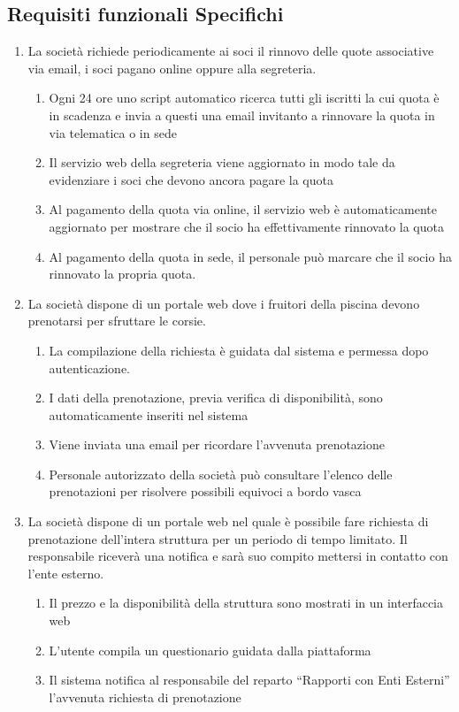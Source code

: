 \documentclass[11pt]{article} %
\begin{document}
\subsection{Requisiti funzionali Specifichi}

\begin{enumerate}
	\item La società richiede periodicamente ai soci il rinnovo delle quote associative via email, i soci pagano online oppure alla segreteria.
	\begin{enumerate}
		\item Ogni 24 ore uno script automatico ricerca tutti gli iscritti la cui quota è in scadenza e invia a questi una email invitanto a rinnovare la quota in via telematica o in sede
		\item Il servizio web della segreteria viene aggiornato in modo tale da evidenziare i soci che devono ancora pagare la quota
		\item Al pagamento della quota via online, il servizio web è automaticamente aggiornato per mostrare che il socio ha effettivamente rinnovato la quota
		\item Al pagamento della quota in sede, il personale può marcare che il socio ha rinnovato la propria quota.
	\end{enumerate}

	\item La società dispone di un portale web dove i fruitori della piscina devono prenotarsi per sfruttare le corsie.
	\begin{enumerate}
		\item La compilazione della richiesta è guidata dal sistema e permessa dopo autenticazione.
		\item I dati della prenotazione, previa verifica di disponibilità, sono automaticamente inseriti nel sistema
		\item Viene inviata una email per ricordare l'avvenuta prenotazione
		\item Personale autorizzato della società può consultare l'elenco delle prenotazioni per risolvere possibili equivoci a bordo vasca
	\end{enumerate}
	\item La società dispone di un portale web nel quale è possibile fare richiesta di prenotazione dell'intera struttura per un periodo di tempo limitato. Il responsabile riceverà una notifica e sarà suo compito mettersi in contatto con l'ente esterno.
	\begin{enumerate}
		\item Il prezzo e la disponibilità della struttura sono mostrati in un interfaccia web
		\item L'utente compila un questionario guidata dalla piattaforma
		\item Il sistema notifica al responsabile del reparto ``Rapporti con Enti Esterni'' l'avvenuta richiesta di prenotazione
	\end{enumerate}
	

\end{enumerate}
\end{document}
